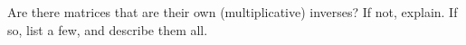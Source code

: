 \documentclass[space,handout,nooutcomes]{ximera}
\begin{document}
\begin{question}
Are there matrices that are their own (multiplicative) inverses?  If not, explain.  If so, list a few, and describe them all.
%
%
\end{question}
\end{document}

